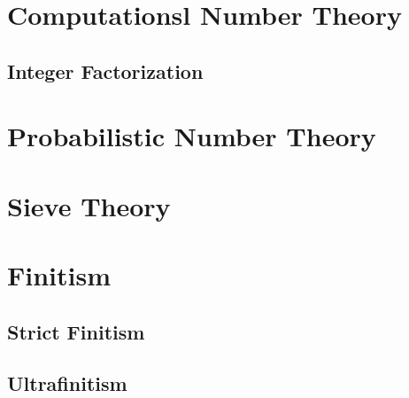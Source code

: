 \section{Computationsl Number Theory}\label{sec:computational_number_theory}

\subsection{Integer Factorization}\label{sec:integer_factorization}



\section{Probabilistic Number Theory}\label{sec:probabilistic_number_theory}

\section{Sieve Theory}\label{sec:sieve_theory}

\section{Finitism}\label{sec:finitism}

\subsection{Strict Finitism}\label{sec:strict_finitism}

\subsection{Ultrafinitism}\label{sec:ultrafinitism}

